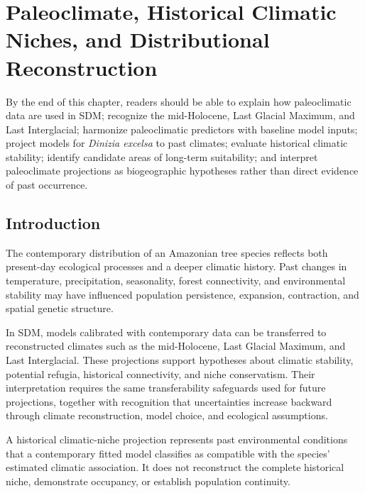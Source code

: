 \chapter[Paleoclimate and historical climatic niches]{Paleoclimate, Historical Climatic Niches, and Distributional Reconstruction}

\begin{objetivos}
By the end of this chapter, readers should be able to explain how paleoclimatic data are used in SDM; recognize the mid-Holocene, Last Glacial Maximum, and Last Interglacial; harmonize paleoclimatic predictors with baseline model inputs; project models for \textit{Dinizia excelsa} to past climates; evaluate historical climatic stability; identify candidate areas of long-term suitability; and interpret paleoclimate projections as biogeographic hypotheses rather than direct evidence of past occurrence.
\end{objetivos}

\section{Introduction}

The contemporary distribution of an Amazonian tree species reflects both present-day ecological processes and a deeper climatic history. Past changes in temperature, precipitation, seasonality, forest connectivity, and environmental stability may have influenced population persistence, expansion, contraction, and spatial genetic structure.

In SDM, models calibrated with contemporary data can be transferred to reconstructed climates such as the mid-Holocene, Last Glacial Maximum, and Last Interglacial. These projections support hypotheses about climatic stability, potential refugia, historical connectivity, and niche conservatism. Their interpretation requires the same transferability safeguards used for future projections, together with recognition that uncertainties increase backward through climate reconstruction, model choice, and ecological assumptions.

\begin{conceito}[title={\faBook\quad Historical climatic niche}]
A historical climatic-niche projection represents past environmental conditions that a contemporary fitted model classifies as compatible with the species' estimated climatic association. It does not reconstruct the complete historical niche, demonstrate occupancy, or establish population continuity.
\end{conceito}

